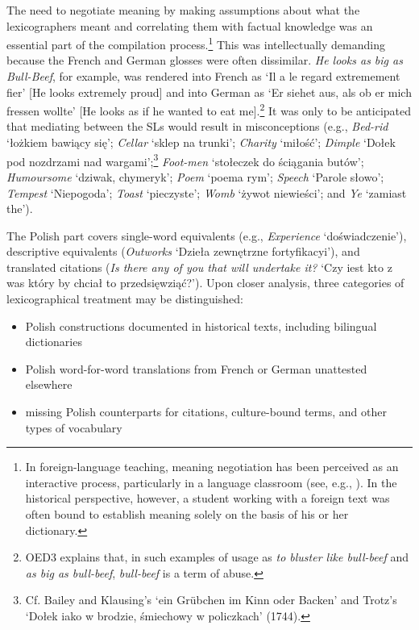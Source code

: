 \documentclass[output=paper,colorlinks,citecolor=brown,arabicfont,chinesefont]{langscibook}
\begin{document}
The need to negotiate meaning by making assumptions about what the lexicographers meant and correlating them with factual knowledge was an essential part of the compilation process.\footnote{In foreign-language teaching, meaning negotiation has been perceived as an interactive process, particularly in a language classroom (see, e.g., \citealt[17]{MacaroWooreGraham2015}). In the historical perspective, however, a student working with a foreign text was often bound to establish meaning solely on the basis of his or her dictionary.} This was intellectually demanding because the French and German glosses were often dissimilar. \emph{He looks as big as Bull-Beef}, for example, was rendered into French as ‘Il a le regard extremement fier’ [He looks extremely proud] and into German as ‘Er siehet aus, als ob er mich fressen wollte’ [He looks as if he wanted to eat me].\footnote{OED3 \citep{OED3} explains that, in such examples of usage as \emph{ to bluster like bull-beef} and \emph{as big as bull-beef}, \emph{bull-beef} is a term of abuse.} It was only to be anticipated that mediating between the SLs would result in misconceptions (e.g., \emph{Bed-rid} ‘łożkiem bawiący się’; \emph{Cellar} ‘sklep na trunki’; \emph{Charity} ‘miłość’; \emph{Dimple} ‘Dołek pod nozdrzami nad wargami’;\footnote{Cf. Bailey and Klausing’s ‘ein Grübchen im Kinn oder Backen’ and Trotz’s ‘Dołek iako w brodzie, śmiechowy w policzkach’ (1744).} \emph{Foot-men} ‘stołeczek do ściągania butów’; \emph{Humoursome} ‘dziwak, chymeryk’; \emph{Poem} ‘poema rym’; \emph{Speech} ‘Parole słowo’; \emph{Tempest} ‘Niepogoda’; \emph{Toast} ‘pieczyste’; \emph{Womb} ‘żywot niewieści’; and \emph{Ye} ‘zamiast the’).

The Polish part covers single-word equivalents (e.g., \emph{Experience} ‘doświadczenie’), descriptive equivalents (\emph{Outworks} ‘Dzieła zewnętrzne fortyfikacyi’), and translated citations (\emph{Is there any of you that will undertake it?} ‘Czy iest kto z was który by chciał to przedsięwziąć?’). Upon closer analysis, three categories of lexicographical treatment may be distinguished: 

\begin{itemize}
    \item Polish constructions documented in historical texts, including bilingual dictionaries
    \item Polish word-for-word translations from French or German unattested elsewhere
    \item missing Polish counterparts for citations, culture-bound terms, and other types of vocabulary
\end{itemize}
\end{document}
